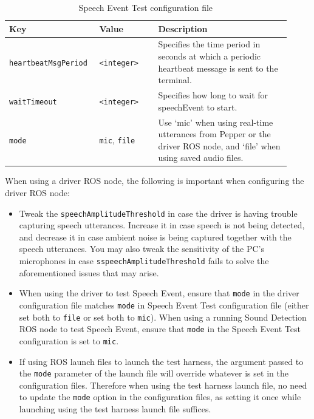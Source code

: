 \documentclass{CSSRforAfrica}
\begin{document}
\begin{center}
\begin{table}[thb]
\begin{tabular}[thb]{|p{0.27\linewidth}|p{0.20\linewidth}|p{0.45\linewidth}|} \hline
\rowcolor{lightgray} Key & Value & Description \\ \hline
\texttt{heartbeatMsgPeriod} & \texttt{<integer>} & Specifies the time period in seconds at which
a periodic heartbeat message is sent to the terminal. \\ \hline
\texttt{waitTimeout} & \texttt{<integer>} & Specifies how long to wait for speechEvent to start. \\ \hline
\texttt{mode} & \texttt{mic}, \texttt{file} & Use `mic' when using real-time utterances from Pepper or the driver ROS node, and `file' when using saved audio files. \\ \hline
\end{tabular}
\caption{Speech Event Test configuration file}
\label{table:test-configuration}
\end{table}
\end{center}

When using a driver ROS node, the following is important when configuring the driver ROS node:

\begin{itemize}
    \item Tweak the \texttt{speechAmplitudeThreshold} in case the driver is having trouble capturing speech utterances. Increase it in case speech is not being detected, and decrease it in case ambient noise is being captured together with the speech utterances. You may also tweak the sensitivity of the PC's microphones in case \texttt{sspeechAmplitudeThreshold} fails to solve the aforementioned issues that may arise.
    \item When using the driver to test Speech Event, ensure that \texttt{mode} in the driver configuration file matches \texttt{mode} in Speech Event Test configuration file (either set both to \texttt{file} or set both to \texttt{mic}). When using a running Sound Detection ROS node to test Speech Event, ensure that \texttt{mode} in the Speech Event Test configuration is set to \texttt{mic}.
    \item If using ROS launch files to launch the test harness, the argument passed to the \texttt{mode} parameter of the launch file will override whatever is set in the configuration files. Therefore when using the test harness launch file, no need to update the \texttt{mode} option in the configuration files, as setting it once while launching using the test harness launch file suffices.
\end{itemize}
\end{document}

